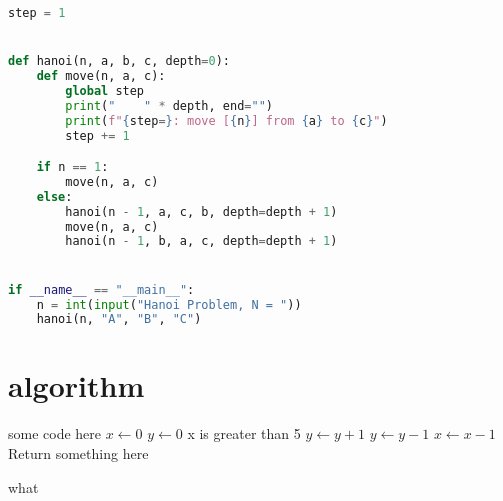 \documentclass{article}
\begin{document}
\begin{lstlisting}[language=Python,caption={hanoi.py}]
step = 1


def hanoi(n, a, b, c, depth=0):
    def move(n, a, c):
        global step
        print("    " * depth, end="")
        print(f"{step=}: move [{n}] from {a} to {c}")
        step += 1

    if n == 1:
        move(n, a, c)
    else:
        hanoi(n - 1, a, c, b, depth=depth + 1)
        move(n, a, c)
        hanoi(n - 1, b, a, c, depth=depth + 1)


if __name__ == "__main__":
    n = int(input("Hanoi Problem, N = "))
    hanoi(n, "A", "B", "C")
\end{lstlisting}

\section{algorithm}


\begin{algorithm}[H]
    \SetAlgoLined
    \SetNoFillComment
    \vspace{3mm}
    some code here\;
    $x \leftarrow 0$\;
    $y \leftarrow 0$\;
     {
        x is greater than 5 
    }
     {
        $y \leftarrow y + 1$\;
    }
     {
        $y \leftarrow y - 1$\;
    }
     {
        $x \leftarrow x - 1$\;
    }
    \Return Return something here\;
    \caption{what}
\end{algorithm}
\end{document}

